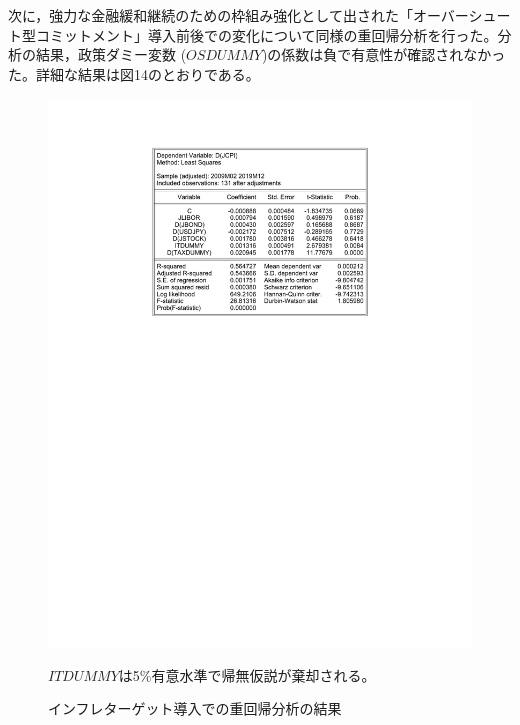 \documentclass[12pt]{jarticle}
\begin{document}
{次に，強力な金融緩和継続のための枠組み強化として出された「オーバーシュート型コミットメント」導入前後での変化について同様の重回帰分析を行った。分析の結果，政策ダミー変数 ($OSDUMMY$)の係数は負で有意性が確認されなかった。詳細な結果は図14のとおりである。

\newpage
\begin{figure}[!htbp]
  \centering
  \caption{インフレターゲット導入での重回帰分析の結果}
  \vspace{5pt}
  \includegraphics[width=12cm]{it.pdf}

  $ITDUMMY$は5\%有意水準で帰無仮説が棄却される。
\end{figure}

}
\end{document}
